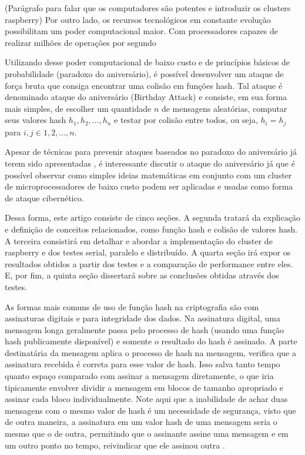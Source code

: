 \documentclass[12pt]{article}
\begin{document}
(Parágrafo para falar que os computadores são potentes e introduzir os clusters raspberry)
Por outro lado, os recursos tecnológicos em constante evolução possibilitam um poder computacional maior. Com 
processadores capazes de realizar milhões de operações por segundo 

Utilizando desse poder computacional de baixo custo e de princípios básicos de probabilidade (paradoxo do aniversário), 
é possível desenvolver um ataque de força bruta que consiga encontrar uma colisão em funções hash. Tal ataque
é denominado ataque do aniversário (Birthday Attack) e consiste, em sua forma mais simples, de escolher um quantidade \(n\) 
de mensagens aleatórias, computar seus valores hash \(h_1, h_2, ... , h_n\) e testar por colisão entre todos, ou seja, 
\(h_i = h_j\) para \(i, j \in {1, 2, ... , n}\).

Apesar de técnicas para prevenir ataques baseados no paradoxo do aniversário já terem sido apresentadas \cite{aiello1996foiling},
é interessante discutir o ataque do aniversário já que é possível observar como simples ideias matemáticas em conjunto
com um cluster de microprocessadores de baixo custo podem ser aplicadas e usadas como forma de ataque cibernético.

Dessa forma, este artigo consiste de cinco seções. A segunda tratará da explicação e definição de conceitos relacionados, 
como função hash e colisão de valores hash. A terceira consistirá em detalhar e abordar a implementação do cluster de 
raspberry e dos testes serial, paralelo e distribuído. A quarta seção irá expor os resultados obtidos a partir dos testes
e a comparação de performance entre eles. E, por fim,  a quinta seção dissertará sobre as conclusões obtidas através dos testes.

\iffalse
As formas mais comuns de uso de função hash na criptografia são com assinaturas digitais e para
integridade dos dados. Na assinatura digital, uma mensagem longa geralmente passa pelo processo
de hash (usando uma função hash publicamente disponível) e somente o resultado do hash é assinado.
A parte destinatária da mensagem aplica o processo de hash na mensagem, verifica que a assinatura
recebida é correta para esse valor de hash. Isso salva tanto tempo quanto espaço comparado com 
assinar a mensagem diretamente, o que iria tipicamente envolver dividir a mensagem em blocos de
tamanho apropriado e assinar cada bloco individualmente. Note aqui que a inabilidade de achar duas
mensagens com o mesmo valor de hash é um necessidade de segurança, visto que de outra maneira, a
assinatura em um valor hash de uma mensagem seria o mesmo que o de outra, permitindo que o assinante
assine uma mensagem e em um outro ponto no tempo, reivindicar que ele assinou outra \cite{menezes1996handbook}.
\end{document}
